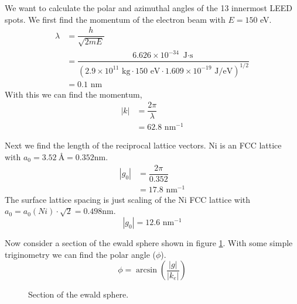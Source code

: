 \documentclass[12pt]{article}
\renewcommand{\=}[1]{\stackrel{#1}{=}} %
\theoremstyle{definition}
\theoremstyle{remark}
\begin{document}
We want to calculate the polar and azimuthal angles of the 13 innermost LEED spots. We first find the momentum of the electron beam with $E=150$ eV.
\begin{align*}
	\lambda &= \dfrac{h}{\sqrt{2mE}}\\[3mm]
		&= \dfrac{6.626\times 10^{-34}\,\,\text{J$\cdot$s}}{\left(2.9\times10^{11}\,\,\text{kg}\cdot 150\,\,\text{eV}\cdot 1.609\times10^{-19}\,\,\text{J/eV}\right)^{1/2}}\\[3mm]
		&= 0.1\,\,\text{nm}
\end{align*}
With this we can find the momentum,
\begin{align*}
|k| &= \dfrac{2\pi}{\lambda}\\[3mm]
	&= 62.8 \,\, \text{nm}^{-1}
\end{align*}

Next we find the length of the reciprocal lattice vectors. Ni is an FCC lattice with $a_0 = \SI{3.52}{\angstrom} = 0.352$nm.
\begin{align*}
|g_0| &= \dfrac{2\pi}{0.352}\\[3mm]
	&= 17.8\,\,\text{nm}^{-1}
\end{align*}
The surface lattice spacing is just scaling of the Ni FCC lattice with $a_0 = a_0(Ni)\cdot \sqrt{2} = 0.498$nm.
\[
|g_0| = 12.6\,\,\text{nm}^{-1}
\]

Now consider a section of the ewald sphere shown in figure \ref{ewald}. With some simple triginometry we can find the polar angle ($\phi$).
\[
	\phi = \arcsin\left(\dfrac{|g|}{|k_e|}\right)
\]
\begin{figure}[H]
\centering
{}
%
%
\caption{Section of the ewald sphere.}
\label{ewald}
\end{figure}
\end{document}
